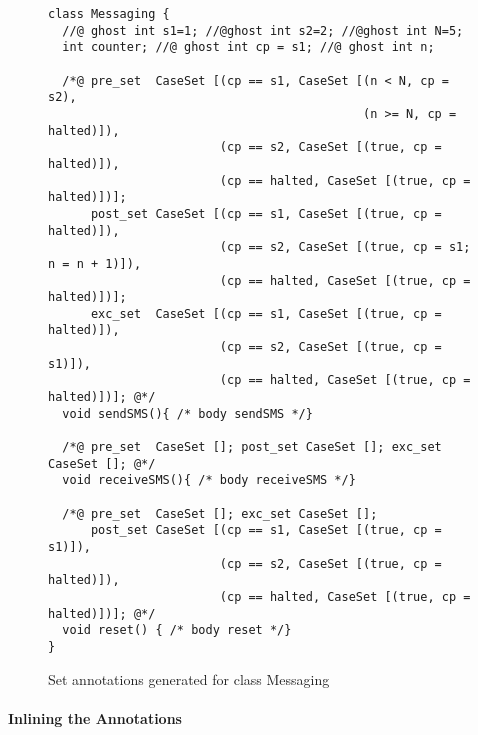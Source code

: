 \begin{figure}[t]
{\small\begin{verbatim}
class Messaging {
  //@ ghost int s1=1; //@ghost int s2=2; //@ghost int N=5;
  int counter; //@ ghost int cp = s1; //@ ghost int n;

  /*@ pre_set  CaseSet [(cp == s1, CaseSet [(n < N, cp = s2),
                                            (n >= N, cp = halted)]),
                        (cp == s2, CaseSet [(true, cp = halted)]),
                        (cp == halted, CaseSet [(true, cp = halted)])];
      post_set CaseSet [(cp == s1, CaseSet [(true, cp = halted)]),
                        (cp == s2, CaseSet [(true, cp = s1; n = n + 1)]),
                        (cp == halted, CaseSet [(true, cp = halted)])];
      exc_set  CaseSet [(cp == s1, CaseSet [(true, cp = halted)]),
                        (cp == s2, CaseSet [(true, cp = s1)]),
                        (cp == halted, CaseSet [(true, cp = halted)])]; @*/
  void sendSMS(){ /* body sendSMS */}

  /*@ pre_set  CaseSet []; post_set CaseSet []; exc_set  CaseSet []; @*/
  void receiveSMS(){ /* body receiveSMS */}

  /*@ pre_set  CaseSet []; exc_set CaseSet [];
      post_set CaseSet [(cp == s1, CaseSet [(true, cp = s1)]),
                        (cp == s2, CaseSet [(true, cp = halted)]),
                        (cp == halted, CaseSet [(true, cp = halted)])]; @*/
  void reset() { /* body reset */}
}
\end{verbatim}}
\caption{Set annotations generated for class Messaging}\label{FigExampleStep2}
\end{figure}



\paragraph{Inlining the Annotations}

